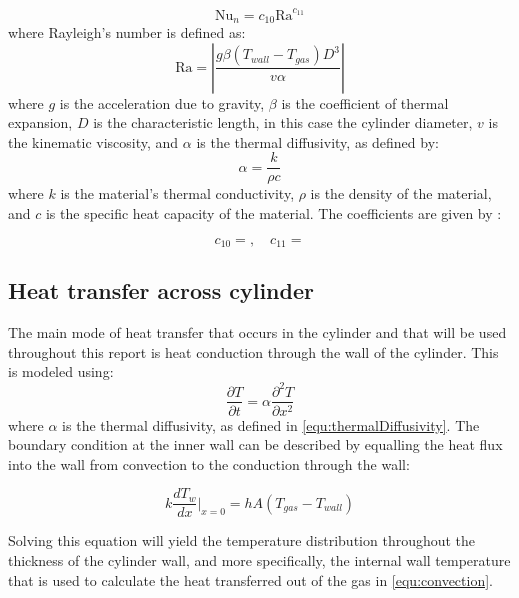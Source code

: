 \begin{equation}
\text{Nu}_n  = c_{10} \text{Ra}^{c_{11}}
\end{equation}
where Rayleigh's number is defined as:
\begin{equation}
\text{Ra} = \left| \frac{g\beta\left(T_{wall} - T_{gas} \right) D^3}{v\alpha}\right|
\end{equation}
where $g$ is the acceleration due to gravity, $\beta$ is the coefficient of thermal expansion, $D$ is the characteristic length, in this case the cylinder diameter, $v$ is the kinematic viscosity, and $\alpha$ is the thermal diffusivity, as defined by:
\begin{equation}
\label{equ:thermalDiffusivity}
\alpha = \frac{k}{\rho c}
\end{equation}
where $k$ is the material's thermal conductivity, $\rho$ is the density of the material, and $c$ is the specific heat capacity of the material. The coefficients are given by :

\begin{equation}
c_{10} =   ,  \quad c_{11} = 
\end{equation}





\subsection{Heat transfer across cylinder}

The main mode of heat transfer that occurs in the cylinder and that will be used throughout this report is heat conduction through the wall of the cylinder. This is modeled using:
\begin{equation}
\label{equ:heatEquation}
\frac{\partial T}{\partial t} = \alpha \frac{\partial^2 T }{\partial x^2}
\end{equation}
where $\alpha$ is the thermal diffusivity, as defined in \cref{equ:thermalDiffusivity}. The boundary condition at the inner wall can be described by equalling the heat flux into the wall from convection to the conduction through the wall:

\begin{equation}
\label{equ:innerWallBC}
k \frac{dT_w}{dx} \bigg\rvert_{x=0} = h A \left( T_{gas} - T_{wall} \right)
\end{equation}

Solving this equation will yield the temperature distribution throughout the thickness of the cylinder wall, and more specifically, the internal wall temperature that is used to calculate the heat transferred out of the gas in \cref{equ:convection}.

